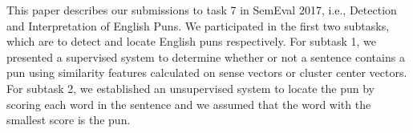 This paper describes our submissions to task 7 in SemEval 2017, i.e., Detection and Interpretation of English Puns. We participated in the first two subtasks, which are to detect and locate English puns respectively. For subtask 1, we presented a supervised system to determine whether or not a sentence contains a pun using similarity features calculated on sense vectors or cluster center vectors. For subtask 2, we established an unsupervised system to locate the pun by scoring each word in the sentence and we assumed that the word with the smallest score is the pun.

